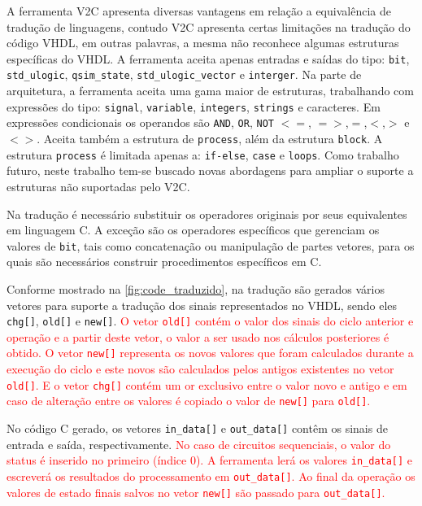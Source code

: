 \par
A ferramenta V2C apresenta diversas vantagens em relação a equivalência de tradução de linguagens, contudo V2C apresenta certas limitações na tradução do código VHDL, em outras palavras, a mesma não reconhece algumas estruturas específicas do VHDL. A ferramenta aceita apenas entradas e saídas do tipo: \texttt{bit}, \texttt{std\_ulogic}, \texttt{qsim\_state}, \texttt{std\_ulogic\_vector} e \texttt{interger}. Na parte de arquitetura, a ferramenta aceita uma gama maior de estruturas, trabalhando com expressões do tipo: \texttt{signal}, \texttt{variable}, \texttt{integers}, \texttt{strings} e caracteres. Em expressões condicionais os operandos são \texttt{AND}, \texttt{OR}, \texttt{NOT} $<=$, $=>$,$=$,$<$,$>$ e $<>$. Aceita também a estrutura de \texttt{process}, além da estrutura \texttt{block}. A estrutura \texttt{process} é limitada apenas a: \texttt{if-else}, \texttt{case} e \texttt{loops}. Como trabalho futuro, neste trabalho tem-se buscado novas abordagens para ampliar o suporte a estruturas não suportadas pelo V2C.

\par
Na tradução é necessário substituir os operadores originais por seus equivalentes em linguagem C. A exceção são os operadores específicos que gerenciam os valores de \texttt{bit}, tais como concatenação ou manipulação de partes vetores, para os quais são necessários construir procedimentos específicos em C.

Conforme mostrado na \autoref{fig:code_traduzido}, na tradução são gerados vários vetores para suporte a tradução dos sinais representados no VHDL, sendo eles \texttt{chg[]}, \texttt{old[]} e \texttt{new[]}. \textcolor{red}{O vetor \texttt{old[]} contém o valor dos sinais do ciclo anterior e operação e a partir deste vetor, o valor a ser usado nos cálculos posteriores é obtido. O vetor \texttt{new[]} representa os novos valores que foram calculados durante a execução do ciclo e este novos são calculados pelos antigos existentes no vetor \texttt{old[]}. E o vetor \texttt{chg[]} contém um or exclusivo entre o valor novo e antigo e em caso de alteração entre os valores é copiado o valor de \texttt{new[]} para \texttt{old[]}.}

\par
No código C gerado, os vetores \texttt{in\_data[]} e \texttt{out\_data[]} contêm os sinais de entrada e saída, respectivamente. \textcolor{red}{No caso de circuitos sequenciais, o valor do status é inserido no primeiro (índice 0). A ferramenta lerá os valores \texttt{in\_data[]} e escreverá os resultados do processamento em \texttt{out\_data[]}. Ao final da operação os valores de estado finais salvos no vetor \texttt{new[]} são passado para \texttt{out\_data[]}.}

